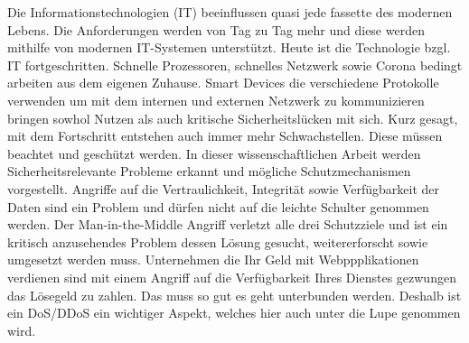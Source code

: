 Die Informationstechnologien (IT) beeinflussen quasi jede fassette des modernen Lebens. Die Anforderungen werden von Tag zu Tag mehr und diese werden mithilfe von modernen IT-Systemen unterstützt. Heute ist die Technologie bzgl. IT fortgeschritten. Schnelle Prozessoren, schnelles Netzwerk sowie Corona bedingt arbeiten aus dem eigenen Zuhause. Smart Devices die verschiedene Protokolle verwenden um mit dem internen und externen Netzwerk zu kommunizieren bringen sowhol Nutzen als auch kritische Sicherheitslücken mit sich. Kurz gesagt, mit dem Fortschritt entstehen auch immer mehr Schwachstellen. Diese müssen beachtet und geschützt werden. In dieser wissenschaftlichen Arbeit werden Sicherheitsrelevante Probleme erkannt und mögliche Schutzmechanismen vorgestellt. Angriffe auf die Vertraulichkeit, Integrität sowie Verfügbarkeit der Daten sind ein Problem und dürfen nicht auf die leichte Schulter genommen werden. Der Man-in-the-Middle Angriff verletzt alle drei Schutzziele und ist ein kritisch anzusehendes Problem dessen Lösung gesucht, weitererforscht sowie umgesetzt werden muss. Unternehmen die Ihr Geld mit Webppplikationen verdienen sind mit einem Angriff auf die Verfügbarkeit Ihres Dienstes gezwungen das Lösegeld zu zahlen. Das muss so gut es geht unterbunden werden. Deshalb ist ein DoS/DDoS ein wichtiger Aspekt, welches hier auch unter die Lupe genommen wird.   
\clearpage